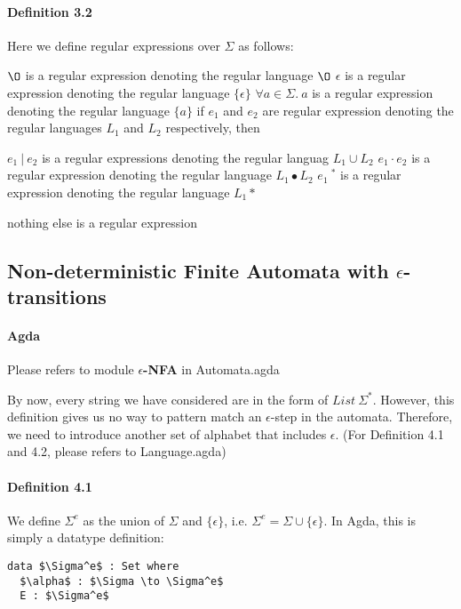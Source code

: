 \documentclass[twoside,openright,final]{bhamthesis}
\renewcommand{\item}{\itemindent0.5cm\itemold}
\begin{document}
\paragraph{Definition 3.2} Here we define regular expressions over
\(\Sigma\) as follows: 
\begin{enumerate}
  \item \(\O\) is a regular expression denoting the regular language \(\O\)
  \item \(\epsilon\) is a regular expression denoting the regular language \(\{\epsilon\}\)
  \item \(\forall a\in\Sigma.\ a\) is a regular expression denoting the regular language \(\{a\}\)
  \item if \(e_{1}\) and \(e_{2}\) are regular expression denoting the regular
    languages \(L_1\) and \(L_2\) respectively, then
    \begin{enumerate}
      \item \(e_{1}\ |\ e_{2}\) is a regular expressions denoting the
        regular languag \(L_1 \cup L_2\)
      \item \(e_{1}\cdot e_{2}\) is a regular expression denoting the
        regular language \(L_1\bullet L_2\)
      \item \(e_{1}\ ^{*}\) is a regular expression denoting the regular
        language \(L_1\ast\) 
     \end{enumerate}
  \item nothing else is a regular expression 
\end{enumerate}

\subsection{Non-deterministic Finite Automata with
  \(\epsilon\)-transitions}
\paragraph{Agda} Please refers to module \textbf{\(\epsilon\)-NFA} in
Automata.agda \\

\par By now, every string we have considered are in the form of
\(List\ \Sigma^*\). However, this definition gives us no way to pattern match
an \(\epsilon\)-step in the automata. Therefore, we need to introduce another
set of alphabet that includes \(\epsilon\). (For Definition 4.1 and
4.2, please refers to Language.agda)

\paragraph{Definition 4.1} We define \(\Sigma^e\) as the union of
\(\Sigma\) and \(\{\epsilon\}\), i.e. \(\Sigma^e = \Sigma \cup
\{\epsilon\}\). In Agda, this is simply a datatype definition:
\begin{lstlisting}[mathescape=true,xleftmargin=.4\textwidth,aboveskip=0pt,belowskip=0pt]
data $\Sigma^e$ : Set where
  $\alpha$ : $\Sigma \to \Sigma^e$
  E : $\Sigma^e$
\end{lstlisting}
\end{document}
